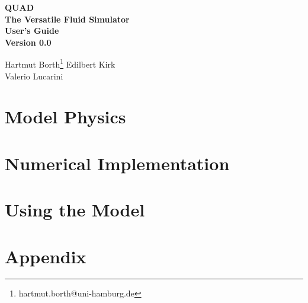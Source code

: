 \documentclass[12pt,twoside,a4paper]{book}
\begin{document}
\begin{titlepage}
\begin{center}
\vspace*{3cm}
{\Huge\bf QUAD} \\
\vspace*{0.5cm}
{\Huge\bf The Versatile Fluid Simulator} \\
\vspace*{1.5cm}
{\huge \bf User's Guide} \\
\vspace*{1cm}
{\huge \bf Version 0.0}
\vspace*{1cm}

{\large 
 Hartmut Borth\footnote{hartmut.borth@uni-hamburg.de} Edilbert Kirk 
                  \\
           Valerio Lucarini 
}

\end{center}
\end{titlepage}



\tableofcontents

\part{Model Physics}

 

\part{Numerical Implementation}

 

 

 

\part{Using the Model}

 
 
 

 

 

\part{Appendix}

\begin{appendix}

 

 
 
 

\end{appendix}



\begin{appendix}
\end{appendix}
\end{document}
